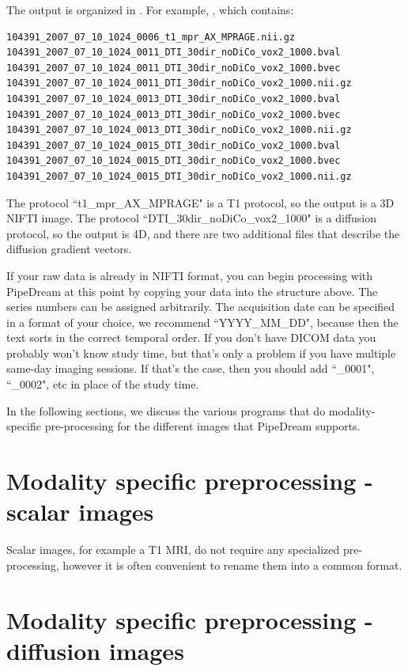 \documentclass{InsightArticle}
\begin{document}
The output is organized in . For example, , which contains:
\begin{lstlisting}[style=bash]
104391_2007_07_10_1024_0006_t1_mpr_AX_MPRAGE.nii.gz
104391_2007_07_10_1024_0011_DTI_30dir_noDiCo_vox2_1000.bval
104391_2007_07_10_1024_0011_DTI_30dir_noDiCo_vox2_1000.bvec
104391_2007_07_10_1024_0011_DTI_30dir_noDiCo_vox2_1000.nii.gz
104391_2007_07_10_1024_0013_DTI_30dir_noDiCo_vox2_1000.bval
104391_2007_07_10_1024_0013_DTI_30dir_noDiCo_vox2_1000.bvec
104391_2007_07_10_1024_0013_DTI_30dir_noDiCo_vox2_1000.nii.gz
104391_2007_07_10_1024_0015_DTI_30dir_noDiCo_vox2_1000.bval
104391_2007_07_10_1024_0015_DTI_30dir_noDiCo_vox2_1000.bvec
104391_2007_07_10_1024_0015_DTI_30dir_noDiCo_vox2_1000.nii.gz
\end{lstlisting}
The protocol ``t1\_mpr\_AX\_MPRAGE" is a T1 protocol, so the output is a 3D NIFTI image. The protocol ``DTI\_30dir\_noDiCo\_vox2\_1000" is a diffusion protocol, so the output is 4D, and there are two additional files that describe the diffusion gradient vectors.

If your raw data is already in NIFTI format, you can begin processing with PipeDream at this point by copying your data into the structure above. The series numbers can be assigned arbitrarily. The acquisition date can be specified in a format of your choice, we recommend ``YYYY\_MM\_DD", because then the text sorts in the correct temporal order. If you don't have DICOM data you probably won't know study time, but that's only a problem if you have multiple same-day imaging sessions. If that's the case, then you should add ``\_0001", ``\_0002", etc in place of the study time.

In the following sections, we discuss the various programs that do modality-specific pre-processing for the different images that PipeDream supports.


\section{Modality specific preprocessing - scalar images}

Scalar images, for example a T1 MRI, do not require any specialized pre-processing, however it is often convenient to rename them into a common format.

\section{Modality specific preprocessing - diffusion images}
\end{document}
